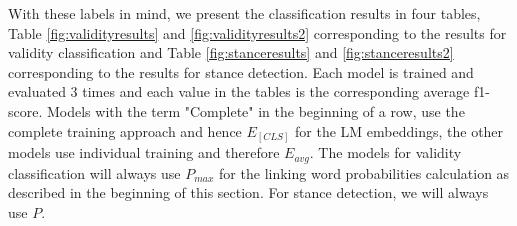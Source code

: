 With these labels in mind, we present the classification results in four tables, Table \ref{fig:validityresults} and \ref{fig:validityresults2} corresponding to the results for validity classification and Table \ref{fig:stanceresults} and \ref{fig:stanceresults2} corresponding to the results for stance detection. Each model is trained and evaluated $3$ times and each value in the tables is the corresponding average f1-score. Models with the term "Complete" in the beginning of a row, use the complete training approach and hence $E_{[CLS]}$ for the LM embeddings, the other models use individual training and therefore $E_{avg}$. The models for validity classification will always use $P_{max}$ for the linking word probabilities calculation as described in the beginning of this section. For stance detection, we will always use $P$. \\

